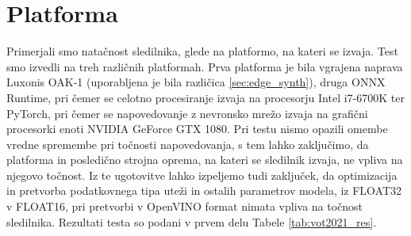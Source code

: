 \documentclass[a4paper,12pt,openright]{book}
\begin{document}
\section{Platforma}
Primerjali smo natačnost sledilnika, glede na platformo, na kateri se izvaja. Test smo izvedli na treh različnih platformah. Prva platforma je bila vgrajena naprava Luxonis OAK-1 (uporabljena je bila različica \ref{sec:edge_synth}), druga ONNX Runtime, pri čemer se celotno procesiranje izvaja na procesorju Intel i7-6700K ter PyTorch, pri čemer se napovedovanje z nevronsko mrežo izvaja na grafični procesorki enoti NVIDIA GeForce GTX 1080. Pri testu nismo opazili omembe vredne spremembe pri točnosti napovedovanja, s tem lahko zaključimo, da platforma in posledično strojna oprema, na kateri se sledilnik izvaja, ne vpliva na njegovo točnost. Iz te ugotovitve lahko izpeljemo tudi zaključek, da optimizacija in pretvorba podatkovnega tipa uteži in ostalih parametrov modela, iz FLOAT32 v FLOAT16, pri pretvorbi v OpenVINO format nimata vpliva na točnost sledilnika. Rezultati testa so podani v prvem delu Tabele \ref{tab:vot2021_res}.
\end{document}
